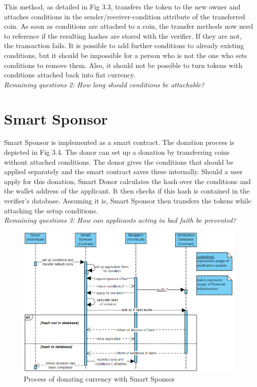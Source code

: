 This method, as detailed in Fig 3.3, transfers the token to the new owner and attaches conditions in the sender/receiver-condition attribute of the transferred coin.
As soon as conditions are attached to a coin, the transfer methods now need to reference if the resulting hashes are stored with the verifier.
If they are not, the transaction fails. It is possible to add further conditions to already existing conditions, but it should be impossible for a person who is not the one who sets conditions to remove them. Also, it should not be possible to turn tokens with conditions attached back into fiat currency.\\
\emph{Remaining questions 2: How long should conditions be attachable?}
\section{Smart Sponsor}
Smart Sponsor is implemented as a smart contract. The donation process is depicted in Fig 3.4. The donor can set up a donation by transferring coins without attached conditions. The donor gives the conditions that should be applied separately and the smart contract saves these internally. Should a user apply for this donation, Smart Donor calculates the hash over the conditions and the wallet address of the applicant. It then checks if this hash is contained in the verifier's database. Assuming it is, Smart Sponsor then transfers the tokens while attaching the setup conditions.\\
\emph{Remaining questions 3: How can applicants acting in bad faith be prevented?}
\begin{figure}[H]
    \centering
    \includegraphics[scale=0.45]{figures/Smart Sponsor.png}  
    \caption{Process of donating currency with Smart Sponsor}
    \label{fig:donationModel}
\end{figure}
